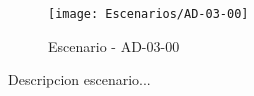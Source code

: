 \begin{figure}[H]
\centering
\texttt{[image: Escenarios/AD-03-00]}
\caption{Escenario - AD-03-00}
\label{fig:AD-03-00}
\end{figure}

Descripcion escenario...
\clearpage
